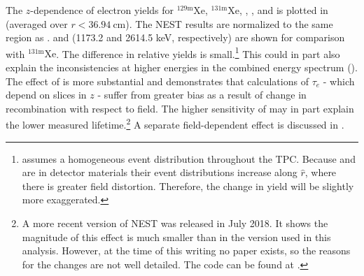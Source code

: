 The $z$-dependence of electron yields for $\mathrm{^{129m}Xe}$, $\mathrm{^{131m}Xe}$, , , and  is
plotted in  (averaged over $r < 36.94\ \mathrm{cm}$).  The NEST results are
normalized to the same region as .   and  (1173.2 and
2614.5 keV, respectively) are shown for comparison with $\mathrm{^{131m}Xe}$.  The difference in relative yields is
small.\footnote{ assumes a homogeneous event distribution throughout the
TPC.  Because  and  are in detector materials their event distributions increase along $\hat{r}$, where
there is greater field distortion.  Therefore, the change in yield will be slightly more exaggerated.}  This
could in part also explain the inconsistencies at higher energies in the combined energy spectrum
().  The
effect of  is more substantial and demonstrates that calculations of $\tau_e$ - which depend on slices in $z$ - suffer from
greater bias as a result of change in recombination with respect to field.  The higher sensitivity of \alphadecays may in part explain
the lower measured lifetime.\footnote{A more recent version of NEST was released in July 2018.  It shows the magnitude of this effect is much
smaller than in the version used in this analysis.  However, at the time of this writing no paper exists, so the reasons for the changes are
not well detailed.  The code can be found at .}  A separate field-dependent effect is discussed in
.

